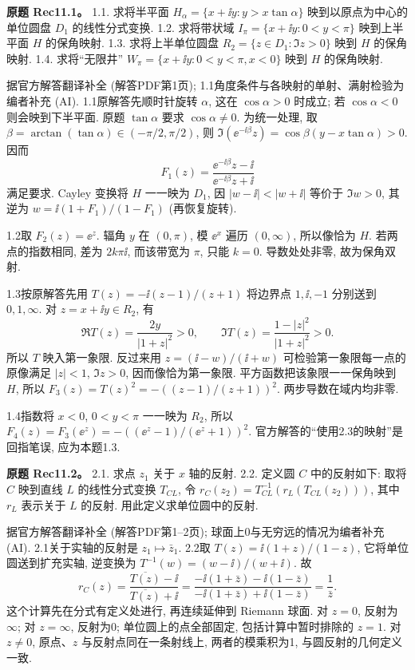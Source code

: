 \begin{exercise}
\textbf{原题 Rec11.1。}\label{ass:rec11-1}
1.1. 求将半平面 $H_\alpha=\{x+\ii y:y>x\tan\alpha\}$ 映到以原点为中心的单位圆盘 $D_1$ 的线性分式变换. 1.2. 求将带状域 $I_\pi=\{x+\ii y:0<y<\pi\}$ 映到上半平面 $H$ 的保角映射. 1.3. 求将上半单位圆盘 $R_2=\{z\in D_1:\Im z>0\}$ 映到 $H$ 的保角映射. 1.4. 求将“无限井” $W_\pi=\{x+\ii y:0<y<\pi,x<0\}$ 映到 $H$ 的保角映射.
\end{exercise}
\begin{solution}
据官方解答翻译补全 (解答PDF第1页); 1.1角度条件与各映射的单射、满射检验为编者补充 (AI). 1.1原解答先顺时针旋转 $\alpha$, 这在 $\cos\alpha>0$ 时成立; 若 $\cos\alpha<0$ 则会映到下半平面. 原题 $\tan\alpha$ 要求 $\cos\alpha\ne0$. 为统一处理, 取 $\beta=\arctan(\tan\alpha)\in(-\pi/2,\pi/2)$, 则 $\Im(\ee^{-\ii\beta}z)=\cos\beta(y-x\tan\alpha)>0$. 因而
\[
F_1(z)=\frac{\ee^{-\ii\beta}z-\ii}{\ee^{-\ii\beta}z+\ii}
\]
满足要求. Cayley 变换将 $H$ 一一映为 $D_1$, 因 $|w-\ii|<|w+\ii|$ 等价于 $\Im w>0$, 其逆为 $w=\ii(1+F_1)/(1-F_1)$ (再恢复旋转).

1.2取 $F_2(z)=\ee^z$. 辐角 $y$ 在 $(0,\pi)$, 模 $\ee^x$ 遍历 $(0,\infty)$, 所以像恰为 $H$. 若两点的指数相同, 差为 $2k\pi\ii$, 而该带宽为 $\pi$, 只能 $k=0$. 导数处处非零, 故为保角双射.

1.3按原解答先用 $T(z)=-\ii(z-1)/(z+1)$ 将边界点 $1,\ii,-1$ 分别送到 $0,1,\infty$. 对 $z=x+\ii y\in R_2$, 有
\[
\Re T(z)=\frac{2y}{|1+z|^2}>0,\qquad
\Im T(z)=\frac{1-|z|^2}{|1+z|^2}>0.
\]
所以 $T$ 映入第一象限. 反过来用 $z=(\ii-w)/(\ii+w)$ 可检验第一象限每一点的原像满足 $|z|<1$, $\Im z>0$, 因而像恰为第一象限. 平方函数把该象限一一保角映到 $H$, 所以 $F_3(z)=T(z)^2=-((z-1)/(z+1))^2$. 两步导数在域内均非零.

1.4指数将 $x<0$, $0<y<\pi$ 一一映为 $R_2$, 所以 $F_4(z)=F_3(\ee^z)=-((\ee^z-1)/(\ee^z+1))^2$. 官方解答的“使用2.3的映射”是回指笔误, 应为本题1.3.
\end{solution}
\begin{exercise}
\textbf{原题 Rec11.2。}\label{ass:rec11-2}
2.1. 求点 $z_1$ 关于 $x$ 轴的反射. 2.2. 定义圆 $C$ 中的反射如下: 取将 $C$ 映到直线 $L$ 的线性分式变换 $T_{CL}$, 令 $r_C(z_2)=T_{CL}^{-1}(r_L(T_{CL}(z_2)))$, 其中 $r_L$ 表示关于 $L$ 的反射. 用此定义求单位圆中的反射.
\end{exercise}
\begin{solution}
据官方解答翻译补全 (解答PDF第1--2页); 球面上0与无穷远的情况为编者补充 (AI). 2.1关于实轴的反射是 $z_1\mapsto\bar z_1$. 2.2取 $T(z)=\ii(1+z)/(1-z)$, 它将单位圆送到扩充实轴, 逆变换为 $T^{-1}(w)=(w-\ii)/(w+\ii)$. 故
\[
r_C(z)=\frac{\overline{T(z)}-\ii}{\overline{T(z)}+\ii}
=\frac{-\ii(1+\bar z)-\ii(1-\bar z)}{-\ii(1+\bar z)+\ii(1-\bar z)}
=\frac1{\bar z}.
\]
这个计算先在分式有定义处进行, 再连续延伸到 Riemann 球面. 对 $z=0$, 反射为 $\infty$; 对 $z=\infty$, 反射为0; 单位圆上的点全部固定, 包括计算中暂时排除的 $z=1$. 对 $z\ne0$, 原点、$z$ 与反射点同在一条射线上, 两者的模乘积为1, 与圆反射的几何定义一致.
\end{solution}
